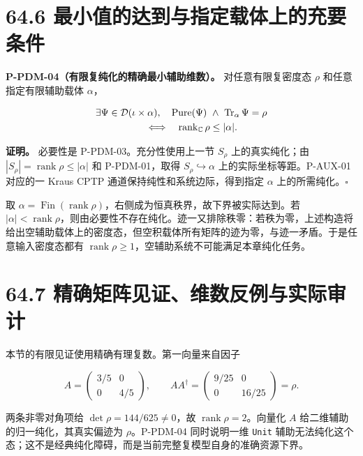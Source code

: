 \documentclass[
  11pt,
  oneside]{book}
\begin{document}
\section{64.6 最小值的达到与指定载体上的充要条件}

\protect\hypertarget{p-pdm-04}{}{}

\textbf{P-PDM-04（有限复纯化的精确最小辅助维数）。} 对任意有限复密度态
\(\rho\) 和任意指定有限辅助载体 \(\alpha\)，

\[
\begin{aligned}
&\exists\Psi\in\mathcal D(\iota\times\alpha),\quad
  \operatorname{Pure}(\Psi)\ \land\ \operatorname{Tr}_\alpha\Psi=\rho\\
&\hspace{18mm}\Longleftrightarrow\quad
  \operatorname{rank}_{\mathbb C}\rho\le|\alpha|.
\end{aligned}
\]

\textbf{证明。} 必要性是 P-PDM-03。充分性使用上一节 \(S_\rho\)
上的真实纯化；由 \(|S_\rho|=\operatorname{rank}\rho\le|\alpha|\) 和
P-PDM-01，取得 \(S_\rho\hookrightarrow\alpha\)
上的实际坐标等距。P-AUX-01 对应的一 Kraus CPTP
通道保持纯性和系统边际，得到指定 \(\alpha\) 上的所需纯化。\(\square\)

取
\(\alpha=\operatorname{Fin}(\operatorname{rank}\rho)\)，右侧成为恒真秩界，故下界被实际达到。若
\(|\alpha|<\operatorname{rank}\rho\)，则由必要性不存在纯化。迹一又排除秩零：若秩为零，上述构造将给出空辅助载体上的密度态，但空积载体所有矩阵的迹为零，与迹一矛盾。于是任意输入密度态都有
\(\operatorname{rank}\rho\ge1\)，空辅助系统不可能满足本章纯化任务。

\section{64.7 精确矩阵见证、维数反例与实际审计}

本节的有限见证使用精确有理复数。第一向量来自因子

\[
A=\begin{pmatrix}3/5&0\\0&4/5\end{pmatrix},
\qquad
AA^\dagger=\begin{pmatrix}9/25&0\\0&16/25\end{pmatrix}=\rho.
\]

两条非零对角项给 \(\det\rho=144/625\ne0\)，故
\(\operatorname{rank}\rho=2\)。向量化 \(A\)
给二维辅助的归一纯化，其真实偏迹为 \(\rho\)。P-PDM-04 同时说明一维
\texttt{Unit}
辅助无法纯化这个态；这不是经典纯化障碍，而是当前完整复模型自身的准确资源下界。
\end{document}
